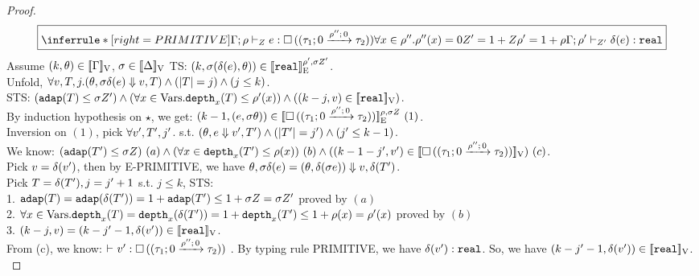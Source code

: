 \documentclass[a4paper,11pt]{article}
\theoremstyle{definition}
\begin{document}
\begin{proof}
\[
  \boxed{
    \inferrule*[right = PRIMITIVE]{
      \Gamma; \dmap \tvdash{\nnatA} \expr:  \tbox{  (\tarr{ \tau_1
        }{ \tau_2 }{0}{\dmap''}{0})     }   \\
      \forall x \in \dmap''. \dmap''(x) = 0 \\
      \nnatA' = 1 + \nnatA \\
      \dmap' = 1 + \dmap
    }{
      \Gamma; \dmap' \tvdash{\nnatA'} \eop(\expr): \treal
    }
    }
\]
Assume $(\stepiA, \env) \in \lrv{\Gamma}$, $ \ienv \in \lrv{\Delta}$ TS: $(\stepiA, \ienv (\eop(\expr), \env)) \in \lre{\dmap'}{\ienv \nnatA'}{\treal}$.\\
%
Unfold, $\forall \valr, \tr, j. (\env, \ienv \eop(\expr) \bigstep \valr, \tr) \land (\size{\tr} = j) \land (j \leq \stepiA)$.\\
%
STS: $(\adap(\tr) \leq \ienv \nnatA') \land (\forall x \in \mbox{Vars}. \ddep{x}(\tr) \leq \dmap'(x)) \land ((\stepiA - j, \valr) \in \lrv{\treal})$.\\
%
By induction hypothesis on $\star$, we get: $(\stepiA-1, (\expr, \ienv \env)) \in \lre{\dmap}{\ienv \nnatA}{\tbox{  (\tarr{ \tau_1}{ \tau_2 }{0}{\dmap''}{0})}} ~ (1)$.\\
%
Inversion on $(1)$, pick $\forall \valr', \tr', j'$. s.t. $ (\env, \expr \bigstep \valr', \tr') \land (\size{\tr'} = j') \land (j' \leq \stepiA-1)$.\\
%
{\color{red}We know: $(\adap(\tr') \leq \ienv \nnatA) ~ (a)
\land (\forall x \in \ddep{x}(\tr') \leq \dmap(x)) ~ (b)
\land ((\stepiA -1- j', \valr') \in \lrv{\tbox{  (\tarr{ \tau_1}{ \tau_2 }{0}{\dmap''}{0})     }}) ~ (c)$.}\\
%
Pick $\valr = \eop(\valr')$, then by E-PRIMITIVE, we have $\env, \ienv \eop(\expr) = (\env, \eop( \ienv \expr) )  \bigstep \valr, \eop(\tr')$.\\
%
Pick $\tr = \eop(\tr'), j = j' + 1$ s.t.  $j \leq k$, STS:\\
%
1. $\adap(\tr) = \adap(\eop(\tr')) = 1 + \adap(\tr') \leq 1 + \ienv \nnatA = \ienv \nnatA'$ proved by $(a)$\\
%
2. $\forall x \in \mbox{Vars}. \ddep{x}(\tr) = \ddep{x}(\eop(\tr')) = 1 + \ddep{x}(\tr') \leq 1 + \dmap(x) = \dmap'(x)$ proved by $(b)$\\
%
{\color{red}
3. $(\stepiA - j, \valr) = (\stepiA - j' - 1, \eop(\valr')) \in \lrv{\treal} $.\\
%
From (c), we know: $\tvdash{} \valr' : \tbox{  (\tarr{ \tau_1}{ \tau_2 }{0}{\dmap''}{0}) }$ . By typing rule PRIMITIVE, we have $\eop(\valr'): \treal$. So, we have $(\stepiA - j' - 1, \eop(\valr')) \in \lrv{\treal}$.\\
%
}


\end{proof}
\end{document}
